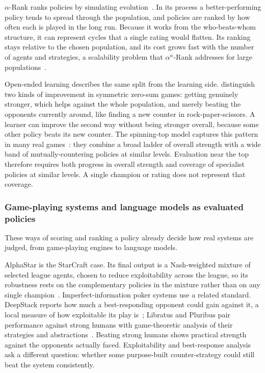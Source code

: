  \(\alpha\)-Rank ranks policies by
simulating evolution~\citep{Omidshafiei2019}. In its process a better-performing
policy tends to spread through the population, and policies are ranked by how often
each is played in the long run. Because it works from the who-beats-whom structure,
it can represent cycles that a single rating would flatten. Its ranking stays
relative to the chosen population, and its cost grows fast with the number of agents and strategies, a scalability
problem that \(\alpha^{\alpha}\)-Rank addresses for
large populations~\citep{Yang2020}.

 Open-ended learning describes the same split from
the learning side. \citet{Balduzzi2019Open} distinguish two kinds of improvement in
symmetric zero-sum games: getting genuinely stronger, which helps against the whole
population, and merely beating the opponents currently around, like finding a new counter in
rock-paper-scissors. A learner can improve the second way without being
stronger overall, because some other policy beats its new counter. The spinning-top
model captures this pattern in many real games~\citep{Czarnecki2020}: they combine a
broad ladder of overall strength with a wide band of mutually-countering policies at
similar levels. Evaluation near the top therefore requires both progress in overall
strength and coverage of specialist policies at similar levels. A single champion
or rating does not represent that coverage.

\subsubsection{Game-playing systems and language models as evaluated policies}
These ways of scoring and ranking a policy already decide how real systems are judged,
from game-playing engines to language models.

 AlphaStar is the StarCraft case. Its final output is a
Nash-weighted mixture of selected league agents, chosen to reduce exploitability
across the league, so its robustness rests on the complementary policies in the
mixture rather than on any single champion~\citep{Vinyals2019}.
Imperfect-information poker systems use a related standard. DeepStack reports how much
a best-responding opponent could gain against it, a local measure of how
exploitable its play is~\citep{Moravcik2017}; Libratus and Pluribus pair performance
against strong humans with game-theoretic analysis of their strategies and
abstractions~\citep{BrownSandholm2018,Brown2019Pluribus}. Beating strong humans shows practical strength against the opponents actually faced.
Exploitability and best-response analysis ask a different question: whether some
purpose-built counter-strategy could still beat the system consistently.

